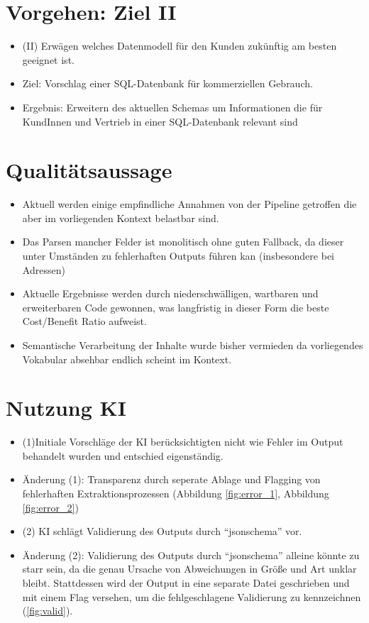 \documentclass[11pt]{article}
\begin{document}
\section{Vorgehen: Ziel II}
\begin{itemize}
    \item (II) Erwägen welches Datenmodell für den Kunden zukünftig am besten geeignet ist.
    \item Ziel: Vorschlag einer SQL-Datenbank für kommerziellen Gebrauch.
    \item Ergebnis: Erweitern des aktuellen Schemas um Informationen die für KundInnen und Vertrieb in einer SQL-Datenbank relevant sind
\end{itemize}
\section{Qualitätsaussage}
\begin{itemize}
    \item Aktuell werden einige empfindliche Annahmen von der Pipeline getroffen die aber im vorliegenden Kontext belastbar sind. 
    \item Das Parsen mancher Felder ist monolitisch ohne guten Fallback, da dieser unter Umständen zu fehlerhaften Outputs führen kan (insbesondere bei Adressen)
    \item Aktuelle Ergebnisse werden durch niederschwälligen, wartbaren und erweiterbaren Code gewonnen, was langfristig in dieser Form die beste Cost/Benefit Ratio aufweist.
    \item Semantische Verarbeitung der Inhalte wurde bisher vermieden da vorliegendes Vokabular absehbar endlich scheint im Kontext.
\end{itemize}
\section{Nutzung KI}
\begin{itemize}
    \item (1)Initiale Vorschläge der KI berücksichtigten nicht wie Fehler im Output behandelt wurden und entschied eigenständig.
    \item Änderung (1): Transparenz durch seperate Ablage und Flagging von fehlerhaften Extraktionsprozessen (Abbildung \ref{fig:error_1}, Abbildung \ref{fig:error_2})
    \item (2) KI schlägt Validierung des Outputs durch \enquote{jsonschema} vor.
    \item Änderung (2): Validierung des Outputs durch \enquote{jsonschema} alleine könnte zu starr sein, da die genau Ursache von Abweichungen in Größe und Art unklar bleibt. Stattdessen wird der Output in eine separate Datei geschrieben und mit einem Flag versehen, um die fehlgeschlagene Validierung zu kennzeichnen (\ref{fig:valid}).
\end{itemize}










\end{document}
